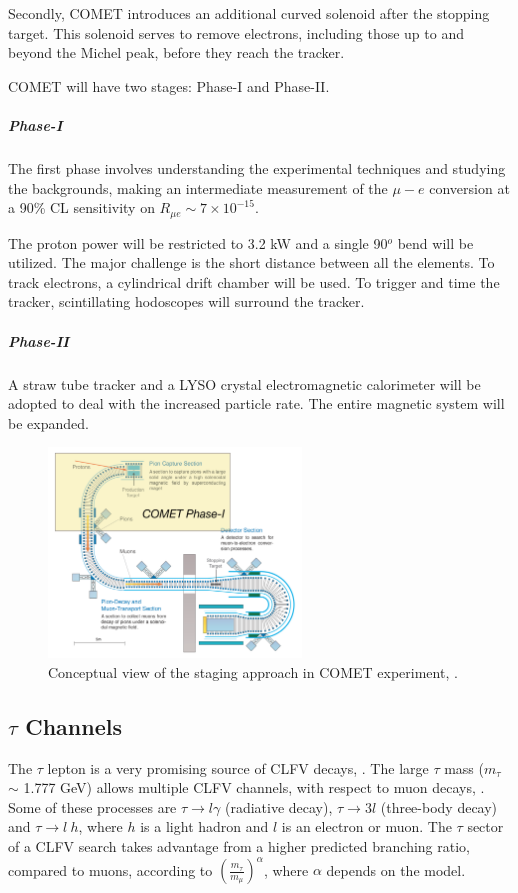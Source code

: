Secondly, COMET introduces an 
additional curved solenoid after 
the stopping target. This solenoid serves 
to remove electrons, including those 
up to and beyond the Michel peak, 
before they reach the tracker.

COMET will have two stages: Phase-I and Phase-II.
\subparagraph*{Phase-I} The first phase 
involves understanding the experimental 
techniques and studying the backgrounds, 
making an intermediate
measurement of the $\mu-e$ conversion at a 90\% CL 
sensitivity on $R_{\mu e} \sim 7\times 10^{-15}$.

The proton power will be restricted to 
3.2 kW and a single 90$^o$ bend will be utilized.
The major challenge is the short distance 
between all the elements. 
To track electrons, a cylindrical drift 
chamber will be used. To trigger and time the tracker, 
scintillating hodoscopes will surround the tracker. 
\subparagraph*{Phase-II} A straw tube 
tracker and a LYSO crystal electromagnetic 
calorimeter will be adopted to deal 
with the increased particle rate. 
The entire magnetic system will be expanded.

\begin{figure}[!h]
\centering
\includegraphics[width =0.6\textwidth]{figures/png/Screenshot_20240307_152133.png}
\caption[COMET experiment.]{Conceptual view of the staging approach in COMET experiment, \cite{Abramishvili_2020}.}
\label{fig:comet}
\end{figure}

\subsection{$\tau$ Channels}
The $\tau$ lepton is a very promising 
source of CLFV decays, \cite{universe8060299}. 
The large $\tau$ mass ($m_\tau$ $\sim$ 1.777 GeV) 
allows  multiple CLFV
channels, with respect to muon decays, 
\cite{clfv_signorelli}. 
Some of these processes are 
$\tau \rightarrow l \gamma$ (radiative decay), $\tau \rightarrow 3l$ (three-body decay) 
and $\tau\rightarrow l \ h$, 
where $h$ is a light hadron and $l$ 
is an electron or muon. The $\tau$ 
sector of a CLFV search takes advantage 
from a higher predicted branching ratio, 
compared to muons, 
according to $(\frac{m_\tau}{m_\mu})^\alpha$, 
where $\alpha$ depends on the model. 

